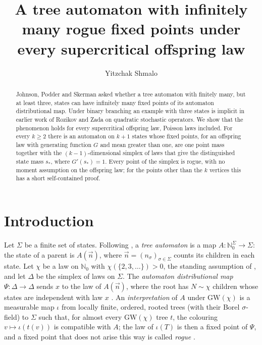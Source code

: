 \documentclass[11pt]{amsart}
\makeatletter
\newcommand{\AUTHORNAME}{Yitzchak Shmalo}
\newcommand{\AFFILIATION}{Einstein Institute of Mathematics, The Hebrew University of Jerusalem, Jerusalem, Israel}
\newcommand{\AUTHOREMAIL}{yitzchak.shmalo@gmail.com}
\theoremstyle{remark}
\newcommand{\N}{\mathbb{N}}
\newcommand{\GW}{\mathrm{GW}}
\makeatother
\begin{document}
\title[Tree automata with a simplex of fixed points]{A tree automaton with infinitely many rogue fixed points under every supercritical offspring law}

\author{\AUTHORNAME}
\address{\AFFILIATION}
\email{\AUTHOREMAIL}


\begin{abstract}
Johnson, Podder and Skerman asked whether a tree automaton with finitely many, but at least three, states can have infinitely many fixed points of its automaton distributional map. Under binary branching an example with three states is implicit in earlier work of Rozikov and Zada on quadratic stochastic operators. We show that the phenomenon holds for every supercritical offspring law, Poisson laws included. For every $k\ge2$ there is an automaton on $k+1$ states whose fixed points, for an offspring law with generating function $G$ and mean greater than one, are one point mass together with the $(k-1)$-dimensional simplex of laws that give the distinguished state mass $s_*$, where $G'(s_*)=1$. Every point of the simplex is rogue, with no moment assumption on the offspring law; for the points other than the $k$ vertices this has a short self-contained proof.
\end{abstract}

\maketitle

\section{Introduction}\label{sec:intro}

Let $\Sigma$ be a finite set of states. Following \cite{JPS}, a \emph{tree automaton} is a map $A\colon \N_0^\Sigma\to\Sigma$: the state of a parent is $A(\vec n)$, where $\vec n=(n_\sigma)_{\sigma\in\Sigma}$ counts its children in each state. Let $\chi$ be a law on $\N_0$ with $\chi(\{2,3,\dots\})>0$, the standing assumption of \cite[Section~1.2]{JPS}, and let $\Delta$ be the simplex of laws on $\Sigma$. The \emph{automaton distributional map} $\Psi\colon \Delta\to \Delta$ sends $x$ to the law of $A(\vec n)$, where the root has $N\sim\chi$ children whose states are independent with law $x$ \cite[Section~1.5]{JPS}. An \emph{interpretation} of $A$ under $\GW(\chi)$ is a measurable map $\iota$ from locally finite, ordered, rooted trees (with their Borel $\sigma$-field) to $\Sigma$ such that, for almost every $\GW(\chi)$ tree $t$, the colouring $v\mapsto\iota(t(v))$ is compatible with $A$; the law of $\iota(T)$ is then a fixed point of $\Psi$, and a fixed point that does not arise this way is called \emph{rogue} \cite[Sections~1.4 and~1.5]{JPS}.
\end{document}
